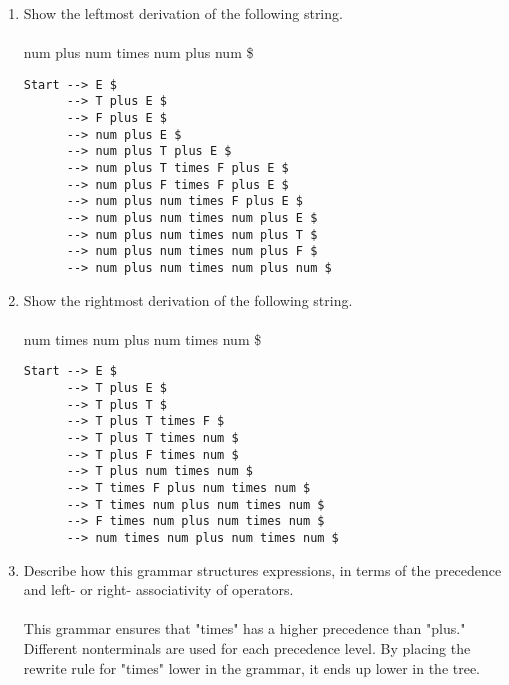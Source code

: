 \documentclass[letterpaper, 10pt,DIV=13]{scrartcl}
\numberwithin{equation}{section} %
\numberwithin{figure}{section} %
\numberwithin{table}{section} %
\begin{document}
\begin{enumerate}[label=\textbf{\Alph*}]
\item Show the leftmost derivation of the following string.\\ \\
num plus num times num plus num \$ \\
\begin{lstlisting}
Start --> E $
      --> T plus E $
      --> F plus E $
      --> num plus E $
      --> num plus T plus E $
      --> num plus T times F plus E $
      --> num plus F times F plus E $
      --> num plus num times F plus E $
      --> num plus num times num plus E $
      --> num plus num times num plus T $
      --> num plus num times num plus F $
      --> num plus num times num plus num $
\end{lstlisting}

\pagebreak

\item Show the rightmost derivation of the following string.\\ \\
num times num plus num times num \$ \\
\begin{lstlisting}
Start --> E $
      --> T plus E $
      --> T plus T $
      --> T plus T times F $
      --> T plus T times num $
      --> T plus F times num $
      --> T plus num times num $
      --> T times F plus num times num $
      --> T times num plus num times num $
      --> F times num plus num times num $
      --> num times num plus num times num $
\end{lstlisting}

\item Describe how this grammar structures expressions, in terms of the precedence and left- or right- associativity of operators.\\ \\
This grammar ensures that "times" has a higher precedence than "plus." Different nonterminals are used for each precedence level. By placing the rewrite rule for "times" lower in the grammar, it ends up lower in the tree.
\end{enumerate}
\end{document}
